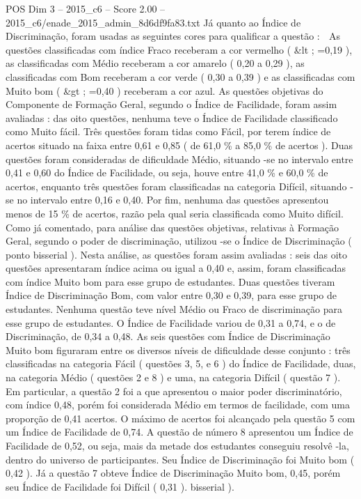 \begin{textsample}{POS Dim 3 – 2015\_c6 – Score 2.00 – 2015\_c6/enade\_2015\_admin\_8d6df9fa83.txt}
Já quanto ao Índice de Discriminação, foram usadas as seguintes cores para qualificar a questão :  As questões classificadas com índice Fraco receberam a cor vermelho ( \&lt ; =0,19 ), as classificadas com Médio receberam a cor amarelo ( 0,20 a 0,29 ), as classificadas com Bom receberam a cor verde ( 0,30 a 0,39 ) e as classificadas com Muito bom ( \&gt ; =0,40 ) receberam a cor azul.
As questões objetivas do Componente de Formação Geral, segundo o Índice de Facilidade, foram assim avaliadas : das oito questões, nenhuma teve o Índice de Facilidade classificado como Muito fácil.
Três questões foram tidas como Fácil, por terem índice de acertos situado na faixa entre 0,61 e 0,85 ( de 61,0 \% a 85,0 \% de acertos ).
Duas questões foram consideradas de dificuldade Médio, situando -se no intervalo entre 0,41 e 0,60 do Índice de Facilidade, ou seja, houve entre 41,0 \% e 60,0 \% de acertos, enquanto três questões foram classificadas na categoria Difícil, situando -se no intervalo entre 0,16 e 0,40.
Por fim, nenhuma das questões apresentou menos de 15 \% de acertos, razão pela qual seria classificada como Muito difícil.
Como já comentado, para análise das questões objetivas, relativas à Formação Geral, segundo o poder de discriminação, utilizou -se o Índice de Discriminação ( ponto bisserial ).
Nesta análise, as questões foram assim avaliadas : seis das oito questões apresentaram índice acima ou igual a 0,40 e, assim, foram classificadas com índice Muito bom para esse grupo de estudantes.
Duas questões tiveram Índice de Discriminação Bom, com valor entre 0,30 e 0,39, para esse grupo de estudantes.
Nenhuma questão teve nível Médio ou Fraco de discriminação para esse grupo de estudantes.
O Índice de Facilidade variou de 0,31 a 0,74, e o de Discriminação, de 0,34 a 0,48.
As seis questões com Índice de Discriminação Muito bom figuraram entre os diversos níveis de dificuldade desse conjunto : três classificadas na categoria Fácil ( questões 3, 5, e 6 ) do Índice de Facilidade, duas, na categoria Médio ( questões 2 e 8 ) e uma, na categoria Difícil ( questão 7 ).
Em particular, a questão 2 foi a que apresentou o maior poder discriminatório, com índice 0,48, porém foi considerada Médio em termos de facilidade, com uma proporção de 0,41 acertos.
O máximo de acertos foi alcançado pela questão 5 com um Índice de Facilidade de 0,74.
A questão de número 8 apresentou um Índice de Facilidade de 0,52, ou seja, mais da metade dos estudantes conseguiu resolvê -la, dentro do universo de participantes.
Seu Índice de Discriminação foi Muito bom ( 0,42 ).
Já a questão 7 obteve Índice de Discriminação Muito bom, 0,45, porém seu Índice de Facilidade foi Difícil ( 0,31 ). bisserial ).

\end{textsample}
